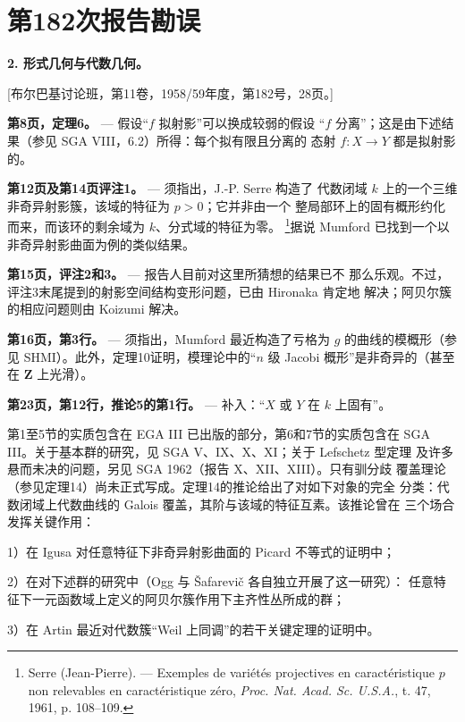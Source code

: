\clearpage
\chapter*{第182次报告勘误}
\setcounter{footnote}{1}

\noindent\textbf{2. 形式几何与代数几何。}

\begin{center}
[布尔巴基讨论班，第11卷，1958/59年度，第182号，28页。]
\end{center}

\noindent\textbf{第8页，定理6。} --- 假设“$f$ 拟射影”可以换成较弱的假设
“$f$ 分离”；这是由下述结果（参见 SGA VIII，6.2）所得：每个拟有限且分离的
态射 $f:X\longrightarrow Y$ 都是拟射影的。

\noindent\textbf{第12页及第14页评注1。} --- 须指出，J.-P. Serre 构造了
代数闭域 $k$ 上的一个三维非奇异射影簇，该域的特征为 $p>0$；它并非由一个
整局部环上的固有概形约化而来，而该环的剩余域为 $k$、分式域的特征为零。
\footnote{Serre (Jean-Pierre). --- Exemples de variétés projectives en
caractéristique $p$ non relevables en caractéristique zéro, \emph{Proc. Nat.
Acad. Sc. U.S.A.}, t. 47, 1961, p. 108--109.}据说 Mumford 已找到一个以
非奇异射影曲面为例的类似结果。

\noindent\textbf{第15页，评注2和3。} --- 报告人目前对这里所猜想的结果已不
那么乐观。不过，评注3末尾提到的射影空间结构变形问题，已由 Hironaka 肯定地
解决；阿贝尔簇的相应问题则由 Koizumi 解决。

\noindent\textbf{第16页，第3行。} --- 须指出，Mumford 最近构造了亏格为
$g$ 的曲线的模概形（参见 SHMI）。此外，定理10证明，模理论中的“$n$ 级
Jacobi 概形”是非奇异的（甚至在 $\mathbf Z$ 上光滑）。

\noindent\textbf{第23页，第12行，推论5的第1行。} --- 补入：“$X$ 或 $Y$
在 $k$ 上固有”。

第1至5节的实质包含在 EGA III 已出版的部分，第6和7节的实质包含在
SGA III。关于基本群的研究，见 SGA V、IX、X、XI；关于 Lefschetz 型定理
及许多悬而未决的问题，另见 SGA 1962（报告 X、XII、XIII）。只有驯分歧
覆盖理论（参见定理14）尚未正式写成。定理14的推论给出了对如下对象的完全
分类：代数闭域上代数曲线的 Galois 覆盖，其阶与该域的特征互素。该推论曾在
三个场合发挥关键作用：

1）在 Igusa 对任意特征下非奇异射影曲面的 Picard 不等式的证明中；

2）在对下述群的研究中（Ogg 与 Šafarevič 各自独立开展了这一研究）：
任意特征下一元函数域上定义的阿贝尔簇作用下主齐性丛所成的群；

3）在 Artin 最近对代数簇“Weil 上同调”的若干关键定理的证明中。

